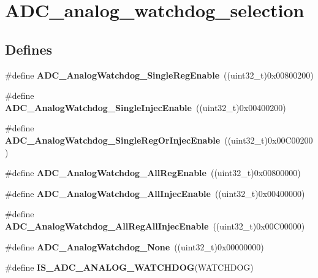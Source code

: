 \hypertarget{group__ADC__analog__watchdog__selection}{
\section{ADC\_\-analog\_\-watchdog\_\-selection}
\label{group__ADC__analog__watchdog__selection}
}
\subsection*{Defines}
\begin{DoxyCompactItemize}
\item 
\hypertarget{group__ADC__analog__watchdog__selection_ga2975552a752f44085d9da54b4e76121e}{
\#define {\bfseries ADC\_\-AnalogWatchdog\_\-SingleRegEnable}~((uint32\_\-t)0x00800200)}
\label{group__ADC__analog__watchdog__selection_ga2975552a752f44085d9da54b4e76121e}

\item 
\hypertarget{group__ADC__analog__watchdog__selection_gaa9904271617ab69593ac68ae540047fb}{
\#define {\bfseries ADC\_\-AnalogWatchdog\_\-SingleInjecEnable}~((uint32\_\-t)0x00400200)}
\label{group__ADC__analog__watchdog__selection_gaa9904271617ab69593ac68ae540047fb}

\item 
\hypertarget{group__ADC__analog__watchdog__selection_gaffd35fc6ceb226ec3fb61fb52227820c}{
\#define {\bfseries ADC\_\-AnalogWatchdog\_\-SingleRegOrInjecEnable}~((uint32\_\-t)0x00C00200)}
\label{group__ADC__analog__watchdog__selection_gaffd35fc6ceb226ec3fb61fb52227820c}

\item 
\hypertarget{group__ADC__analog__watchdog__selection_ga37f08e1a4a452a2c148341b3cfcdeb1e}{
\#define {\bfseries ADC\_\-AnalogWatchdog\_\-AllRegEnable}~((uint32\_\-t)0x00800000)}
\label{group__ADC__analog__watchdog__selection_ga37f08e1a4a452a2c148341b3cfcdeb1e}

\item 
\hypertarget{group__ADC__analog__watchdog__selection_gae4d6a7ebb136d924f0c8bad2cbac0574}{
\#define {\bfseries ADC\_\-AnalogWatchdog\_\-AllInjecEnable}~((uint32\_\-t)0x00400000)}
\label{group__ADC__analog__watchdog__selection_gae4d6a7ebb136d924f0c8bad2cbac0574}

\item 
\hypertarget{group__ADC__analog__watchdog__selection_ga25a299f4493aaae316521351198df084}{
\#define {\bfseries ADC\_\-AnalogWatchdog\_\-AllRegAllInjecEnable}~((uint32\_\-t)0x00C00000)}
\label{group__ADC__analog__watchdog__selection_ga25a299f4493aaae316521351198df084}

\item 
\hypertarget{group__ADC__analog__watchdog__selection_ga91f69979e0e449fef5a8b225a21e3eb9}{
\#define {\bfseries ADC\_\-AnalogWatchdog\_\-None}~((uint32\_\-t)0x00000000)}
\label{group__ADC__analog__watchdog__selection_ga91f69979e0e449fef5a8b225a21e3eb9}

\item 
\#define {\bfseries IS\_\-ADC\_\-ANALOG\_\-WATCHDOG}(WATCHDOG)
\end{DoxyCompactItemize}


